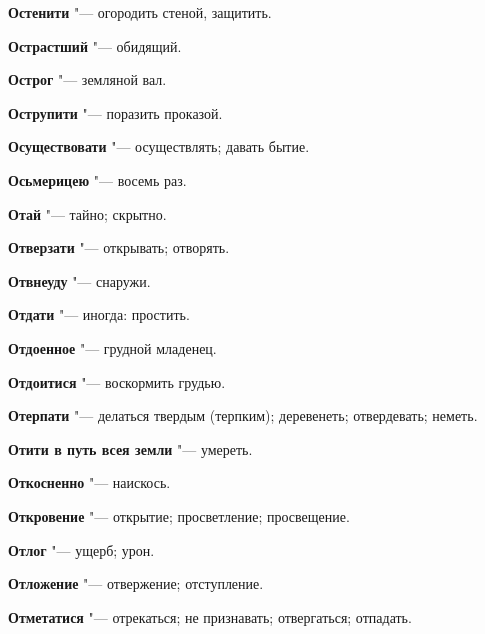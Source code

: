 \begin{mymulticols}{2}
\noindent\textbf{Остенити} "--- огородить стеной, защитить. 




\noindent\textbf{Острастший} "--- обидящий. 




\noindent\textbf{Острог} "--- земляной вал. 




\noindent\textbf{Острупити} "--- поразить проказой. 




\noindent\textbf{Осуществовати} "--- осуществлять; давать бытие. 




\noindent\textbf{Осьмерицею} "--- восемь раз. 




\noindent\textbf{Отай} "--- тайно; скрытно. 




\noindent\textbf{Отверзати} "--- открывать; отворять. 




\noindent\textbf{Отвнеуду} "--- снаружи. 




\noindent\textbf{Отдати} "--- иногда: простить. 




\noindent\textbf{Отдоенное} "--- грудной младенец. 




\noindent\textbf{Отдоитися} "--- воскормить грудью. 




\noindent\textbf{Отерпати} "--- делаться твердым (терпким); деревенеть; отвердевать; неметь. 




\noindent\textbf{Отити в путь всея земли} "--- умереть. 




\noindent\textbf{Откосненно} "--- наискось. 




\noindent\textbf{Откровение} "--- открытие; просветление; просвещение. 




\noindent\textbf{Отлог} "--- ущерб; урон. 




\noindent\textbf{Отложение} "--- отвержение; отступление. 




\noindent\textbf{Отметатися} "--- отрекаться; не признавать; отвергаться; отпадать. 





\end{mymulticols}
